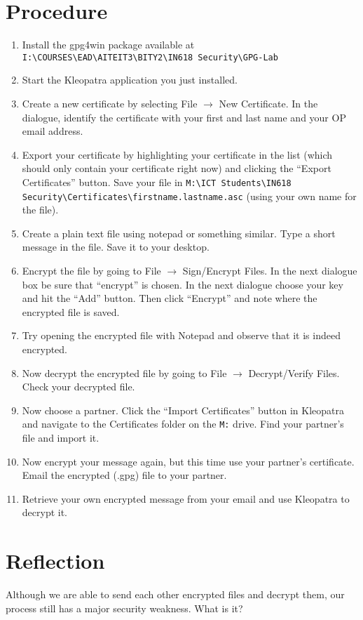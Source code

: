 \documentclass{article}
\begin{document}
\section{Procedure}
\begin{enumerate}
\item Install the gpg4win package available at \texttt{I:\textbackslash{}COURSES\textbackslash{}EAD\textbackslash{}AITEIT3\textbackslash{}BITY2\textbackslash{}IN618 Security\textbackslash{}GPG-Lab}

\item Start the Kleopatra application you just installed.

\item Create a new certificate by selecting File $\rightarrow$ New Certificate. In the dialogue, identify the certificate with your first and last name and your OP email address.

\item Export your certificate by highlighting your certificate in the list (which should only contain your certificate right now) and clicking the ``Export Certificates'' button. Save your file in \texttt{M:\textbackslash{}ICT Students\textbackslash{}IN618 Security\textbackslash{}Certificates\textbackslash{}firstname.lastname.asc} (using your own name for the file).

\item Create a plain text file using notepad or something similar. Type a short message in the file. Save it to your desktop.

\item Encrypt the file by going to File $\rightarrow$ Sign/Encrypt Files. In the next dialogue box be sure that ``encrypt'' is chosen. In the next dialogue choose your key and hit the ``Add'' button. Then click ``Encrypt'' and note where the encrypted file is saved.

\item Try opening the encrypted file with Notepad and observe that it is indeed encrypted.

\item Now decrypt the encrypted file by going to File $\rightarrow$ Decrypt/Verify Files. Check your decrypted file.

\item Now choose a partner. Click the ``Import Certificates'' button in Kleopatra and navigate to the Certificates folder on the \texttt{M:} drive. Find your partner's file and import it.

\item Now encrypt your message again, but this time use your partner's certificate. Email the encrypted (.gpg) file to your partner.

\item Retrieve your own encrypted message from your email and use Kleopatra to decrypt it.
\end{enumerate}

\section{Reflection}
Although we are able to send each other encrypted files and decrypt them, our process still has a major security weakness. What is it?
\end{document}
